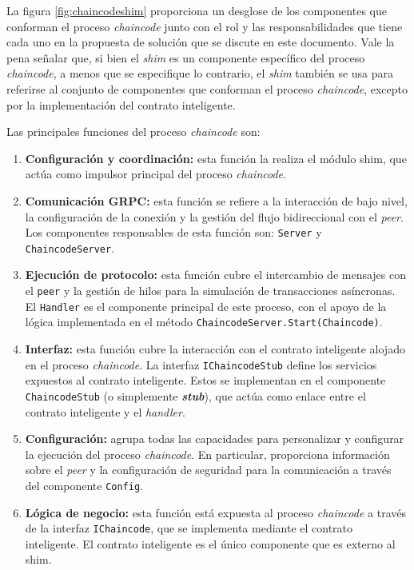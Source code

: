 La figura \ref{fig:chaincodeshim} proporciona un desglose de los componentes que conforman el proceso \textit{chaincode} junto con el rol y las responsabilidades que tiene cada uno en la propuesta de solución que se discute en este documento. Vale la pena señalar que, si bien el \textit{shim} es un componente específico del proceso \textit{chaincode}, a menos que se especifique lo contrario, el \textit{shim} también se usa para referirse al conjunto de componentes que conforman el proceso \textit{chaincode}, excepto por la implementación del contrato inteligente.



Las principales funciones del proceso \textit{chaincode} son:

\begin{enumerate}
\item \textbf{Configuración y coordinación:} esta función la realiza el módulo shim, que actúa como impulsor principal del proceso \textit{chaincode}.

\item \textbf{Comunicación GRPC:} esta función se refiere a la interacción de bajo nivel, la configuración de la conexión y la gestión del flujo bidireccional con el \textit{peer}. Los componentes responsables de esta función son: \texttt{Server} y \texttt{ChaincodeServer}.

\item \textbf{Ejecución de protocolo:} esta función cubre el intercambio de mensajes con el \texttt{peer} y la gestión de hilos para la simulación de transacciones asíncronas. El \texttt{Handler} es el componente principal de este proceso, con el apoyo de la lógica implementada en el método \texttt{ChaincodeServer.Start(Chaincode)}.

\item \textbf{Interfaz:} esta función cubre la interacción con el contrato inteligente alojado en el proceso \textit{chaincode}. La interfaz \texttt{IChaincodeStub} define los servicios expuestos al contrato inteligente. Estos se implementan en el componente \texttt{ChaincodeStub} (o simplemente \textit{\textbf{stub}}), que actúa como enlace entre el contrato inteligente y el \textit{handler}. 

\item \textbf{Configuración:} agrupa todas las capacidades para personalizar y configurar la ejecución del proceso \textit{chaincode}. En particular, proporciona información sobre el \textit{peer} y la configuración de seguridad para la comunicación a través del componente \texttt{Config}.

\item  \textbf{Lógica de negocio:} esta función está expuesta al proceso \textit{chaincode} a través de la interfaz \texttt{IChaincode}, que se implementa mediante el contrato inteligente. El contrato inteligente es el único componente que es externo al shim.
\end{enumerate}



